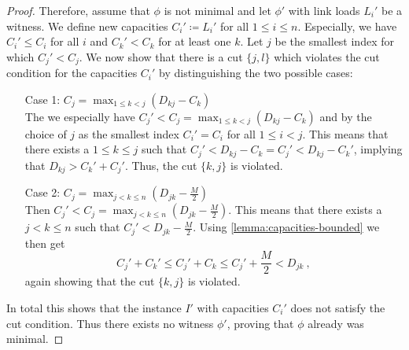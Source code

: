 \begin{proof}
	Therefore, assume that $\phi$ is not minimal and let $\phi'$ with link loads $L_i'$ be a witness.
	We define new capacities $C_i' \coloneqq L_i'$ for all $1 \leq i \leq n$.
	Especially, we have $C_i' \leq C_i$ for all $i$ and $C_k' < C_k$ for at least one $k$.
	Let $j$ be the smallest index for which $C_j' < C_j$.
	We now show that there is a cut $\{j, l\}$ which violates the cut condition for the capacities $C_i'$ by distinguishing the two possible cases:
	\begin{enumerate}[align=left]
		\item[Case 1: $C_j = \max_{1 \leq k < j}(D_{kj} - C_k)$]{\mbox{}\\
			The we especially have $C_j' < C_j = \max_{1 \leq k < j}(D_{kj} - C_k)$ and by the choice of $j$ as the smallest index $C_i' = C_i$ for all $1 \leq i < j$.
			This means that there exists a $1 \leq k \leq j$ such that $C_j' < D_{kj} - C_k = C_j' < D_{kj} - C_k'$, implying that $D_{kj} > C_k' + C_j'$.
			Thus, the cut $\{k, j\}$ is violated.
		}
		\item[Case 2: $C_j = \max_{j < k \leq n}(D_{jk} - \frac{M}{2})$]{\mbox{}\\
			Then $C_j' < C_j = \max_{j < k \leq n}(D_{jk} - \frac{M}{2})$.
			This means that there exists a $j < k \leq n$ such that $C_j' < D_{jk} - \frac{M}{2}$.
			Using \cref{lemma:capacities-bounded} we then get 
			\begin{equation}
				C_j' + C_k' \leq C_j' + C_k \leq C_j' + \frac{M}{2} < D_{jk} \ ,
			\end{equation}
			again showing that the cut $\{k, j\}$ is violated.
		}
	\end{enumerate}
	In total this shows that the instance $I'$ with capacities $C_i'$ does not satisfy the cut condition.
	Thus there exists no witness $\phi'$, proving that $\phi$ already was minimal.
\end{proof}

